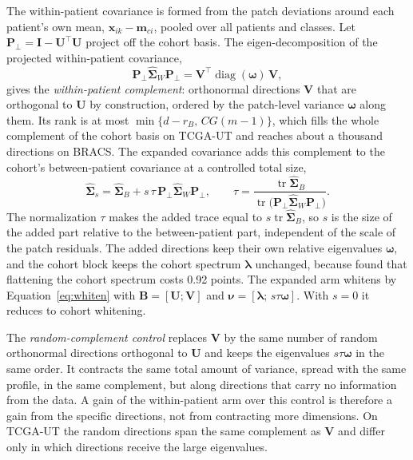 \documentclass[11pt]{article}
\begin{document}
The within-patient covariance is formed from the patch deviations around each patient's own mean, $\mathbf x_{ik}-\mathbf m_{ci}$, pooled over all patients and classes. Let $\mathbf P_\perp=\mathbf I-\mathbf U^\top\mathbf U$ project off the cohort basis. The eigen-decomposition of the projected within-patient covariance,
\begin{equation}
  \mathbf P_\perp\hat{\boldsymbol\Sigma}_W\mathbf P_\perp=\mathbf V^\top\operatorname{diag}(\boldsymbol\omega)\,\mathbf V ,
  \label{eq:within}
\end{equation}
\noindent gives the \emph{within-patient complement}: orthonormal directions $\mathbf V$ that are orthogonal to $\mathbf U$ by construction, ordered by the patch-level variance $\boldsymbol\omega$ along them. Its rank is at most $\min\{d-r_B,\,CG(m-1)\}$, which fills the whole complement of the cohort basis on TCGA-UT and reaches about a thousand directions on BRACS. The expanded covariance adds this complement to the cohort's between-patient covariance at a controlled total size,
\begin{equation}
  \hat{\boldsymbol\Sigma}_s=\hat{\boldsymbol\Sigma}_B+s\,\tau\,\mathbf P_\perp\hat{\boldsymbol\Sigma}_W\mathbf P_\perp,
  \qquad
  \tau=\frac{\operatorname{tr}\hat{\boldsymbol\Sigma}_B}{\operatorname{tr}\bigl(\mathbf P_\perp\hat{\boldsymbol\Sigma}_W\mathbf P_\perp\bigr)} .
  \label{eq:expanded}
\end{equation}
\noindent The normalization $\tau$ makes the added trace equal to $s\operatorname{tr}\hat{\boldsymbol\Sigma}_B$, so $s$ is the size of the added part relative to the between-patient part, independent of the scale of the patch residuals. The added directions keep their own relative eigenvalues $\boldsymbol\omega$, and the cohort block keeps the cohort spectrum $\boldsymbol\lambda$ unchanged, because \citet{queisler2026spectrumRegularization} found that flattening the cohort spectrum costs 0.92 points. The expanded arm whitens by Equation~\ref{eq:whiten} with $\mathbf B=[\mathbf U;\mathbf V]$ and $\boldsymbol\nu=[\boldsymbol\lambda;\,s\tau\boldsymbol\omega]$. With $s=0$ it reduces to cohort whitening.

The \emph{random-complement control} replaces $\mathbf V$ by the same number of random orthonormal directions orthogonal to $\mathbf U$ and keeps the eigenvalues $s\tau\boldsymbol\omega$ in the same order. It contracts the same total amount of variance, spread with the same profile, in the same complement, but along directions that carry no information from the data. A gain of the within-patient arm over this control is therefore a gain from the specific directions, not from contracting more dimensions. On TCGA-UT the random directions span the same complement as $\mathbf V$ and differ only in which directions receive the large eigenvalues.
\end{document}
